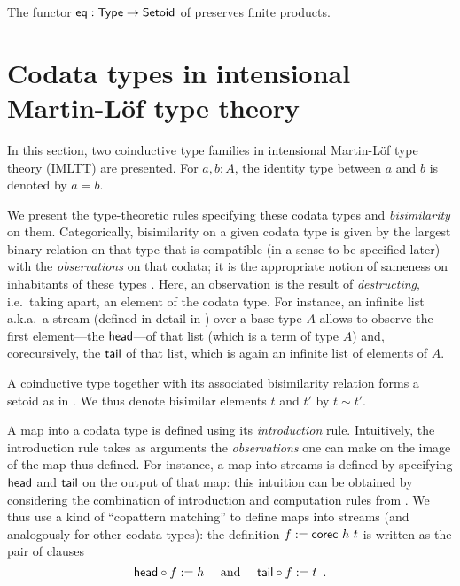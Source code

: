 \documentclass[a4paper,USenglish]{lipics}
\newcommand{\parencite}[1]{\cite{#1}}
\begin{document}
\begin{ex}
  The functor $\mathsf{eq}: \mathsf{Type} \to \mathsf{Setoid}$ of  preserves finite products.
\end{ex}


\section{Codata types in intensional Martin-L\"of type theory}\label{sec:tri}

In this section, two coinductive type families in intensional Martin-L\"of type theory (IMLTT) \parencite{martin_lof} are presented.
For $a,b : A$, the identity type between $a$ and $b$ is denoted by $a = b$.

We present the type-theoretic rules specifying these codata types and \emph{bisimilarity} on them.
Categorically, bisimilarity on a given codata type is given by the largest binary relation on that type that is 
compatible (in a sense to be specified later) with the \emph{observations} on that codata; it is the appropriate notion of sameness on inhabitants of these types \parencite{DBLP:conf/types/Coquand93}.
Here, an observation is the result of \emph{destructing}, i.e.\ taking apart, an element of the codata type.
For instance, an infinite list a.k.a.\ a stream (defined in detail in ) over a base type $A$ allows to observe the first element---the $\mathsf{head}$---of that list (which is a term of type $A$) and,
corecursively, the $\mathsf{tail}$ of that list, which is again an infinite list of elements of $A$.

A coinductive type together with its associated bisimilarity relation forms a setoid as in .
We thus denote bisimilar elements $t$ and $t'$ by $t \sim t'$. 

A map into a codata type is defined using its \emph{introduction} rule.
Intuitively, the introduction rule takes as arguments the \emph{observations} one can make on the image of the map thus defined.
For instance, a map into streams is defined by specifying $\mathsf{head}$ and $\mathsf{tail}$ on the output of that map: this intuition
  can be obtained by considering the combination of introduction and computation rules from .
  We thus use a kind of \enquote{copattern matching} \parencite{DBLP:conf/popl/AbelPTS13} to define maps into streams (and analogously for other codata types): 
  the definition $f := \mathsf{corec}~h~t$ is written as
  the pair of clauses 
   \[{\mathsf{head}} \circ {f} := h \quad \text{ and } \quad {\ensuremath{\mathsf{tail}}} \circ {f}:= t \enspace . \]
\end{document}
